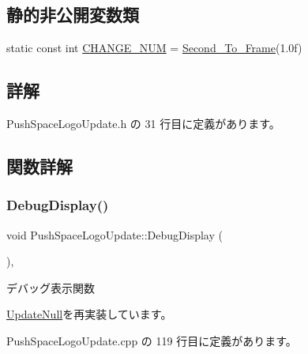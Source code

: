 \subsection*{静的非公開変数類}
\begin{DoxyCompactItemize}
\item 
static const int \mbox{\hyperlink{class_push_space_logo_update_a19a827951aba3490bd1fa2d78252838a}{C\+H\+A\+N\+G\+E\+\_\+\+N\+UM}} = \mbox{\hyperlink{_time_to_frame_8h_acce6a90aebf40509e02a2c7c6cc3dc3d}{Second\+\_\+\+To\+\_\+\+Frame}}(1.\+0f)
\end{DoxyCompactItemize}


\subsection{詳解}


 Push\+Space\+Logo\+Update.\+h の 31 行目に定義があります。



\subsection{関数詳解}
\mbox{\label{class_push_space_logo_update_ab18a0c905455da17f9e2f1fe5f0c34e6}} 
\subsubsection{\texorpdfstring{Debug\+Display()}{DebugDisplay()}}
{\footnotesize\ttfamily void Push\+Space\+Logo\+Update\+::\+Debug\+Display (\begin{DoxyParamCaption}{ }\end{DoxyParamCaption})\hspace{0.3cm}{\ttfamily [override]}, {\ttfamily [virtual]}}



デバッグ表示関数 



\mbox{\hyperlink{class_update_null_a77aee1e614cf6dafe4f9af58b2205e4b}{Update\+Null}}を再実装しています。



 Push\+Space\+Logo\+Update.\+cpp の 119 行目に定義があります。

\mbox{\label{class_push_space_logo_update_a9c165604160c012b429c1db1d67ffb2a}} 
